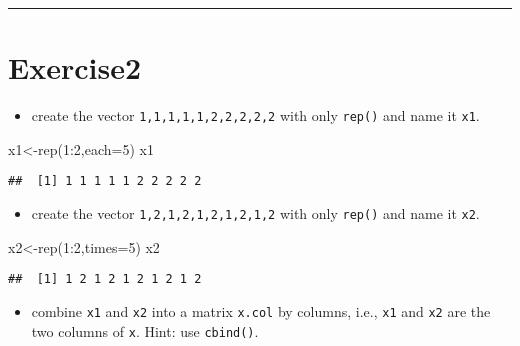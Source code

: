 \documentclass[
]{article}
\newenvironment{Shaded}{\begin{snugshade}}{\end{snugshade}}
\newcommand{\AttributeTok}[1]{\textcolor[rgb]{0.77,0.63,0.00}{#1}}
\newcommand{\DecValTok}[1]{\textcolor[rgb]{0.00,0.00,0.81}{#1}}
\newcommand{\FunctionTok}[1]{\textcolor[rgb]{0.00,0.00,0.00}{#1}}
\newcommand{\NormalTok}[1]{#1}
\newcommand{\OtherTok}[1]{\textcolor[rgb]{0.56,0.35,0.01}{#1}}
\newcommand{\SpecialCharTok}[1]{\textcolor[rgb]{0.00,0.00,0.00}{#1}}
\providecommand{\tightlist}{%
  \setlength{\itemsep}{0pt}\setlength{\parskip}{0pt}}
\begin{document}
\begin{center}\rule{0.5\linewidth}{0.5pt}\end{center}

\hypertarget{exercise2}{%
\section{Exercise2}\label{exercise2}}

\begin{itemize}
\tightlist
\item
  create the vector \texttt{1,1,1,1,1,2,2,2,2,2} with only
  \texttt{rep()} and name it \texttt{x1}.
\end{itemize}

\begin{Shaded}
\begin{Highlighting}[]
\NormalTok{x1}\OtherTok{\textless{}{-}}\FunctionTok{rep}\NormalTok{(}\DecValTok{1}\SpecialCharTok{:}\DecValTok{2}\NormalTok{,}\AttributeTok{each=}\DecValTok{5}\NormalTok{)}
\NormalTok{x1}
\end{Highlighting}
\end{Shaded}

\begin{verbatim}
##  [1] 1 1 1 1 1 2 2 2 2 2
\end{verbatim}

\begin{itemize}
\tightlist
\item
  create the vector \texttt{1,2,1,2,1,2,1,2,1,2} with only
  \texttt{rep()} and name it \texttt{x2}.
\end{itemize}

\begin{Shaded}
\begin{Highlighting}[]
\NormalTok{x2}\OtherTok{\textless{}{-}}\FunctionTok{rep}\NormalTok{(}\DecValTok{1}\SpecialCharTok{:}\DecValTok{2}\NormalTok{,}\AttributeTok{times=}\DecValTok{5}\NormalTok{)}
\NormalTok{x2}
\end{Highlighting}
\end{Shaded}

\begin{verbatim}
##  [1] 1 2 1 2 1 2 1 2 1 2
\end{verbatim}

\begin{itemize}
\tightlist
\item
  combine \texttt{x1} and \texttt{x2} into a matrix \texttt{x.col} by
  columns, i.e., \texttt{x1} and \texttt{x2} are the two columns of
  \texttt{x}. Hint: use \texttt{cbind()}.
\end{itemize}
\end{document}
